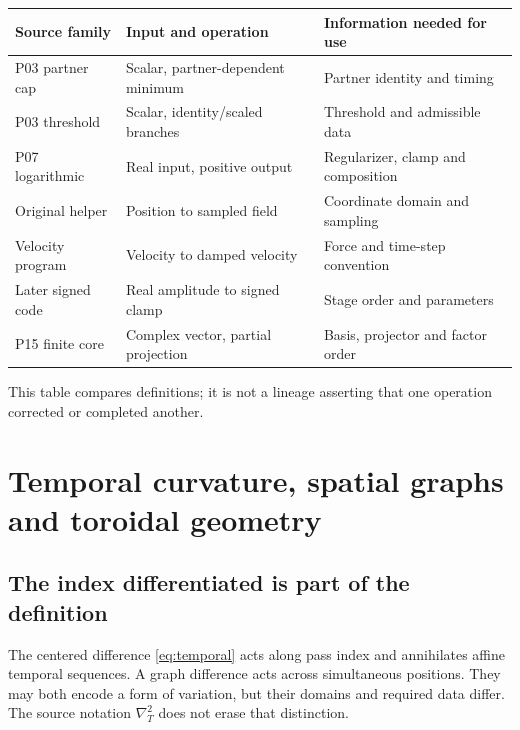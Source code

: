 \documentclass[11pt,a4paper]{article}
\theoremstyle{definition}
\numberwithin{equation}{section}
\begin{document}
\begin{center}
\small
\renewcommand{\arraystretch}{1.18}
\begin{tabularx}{\textwidth}{@{}p{}YY@{}}
\toprule
Source family & Input and operation & Information needed for use\\
\midrule
P03 partner cap & Scalar, partner-dependent minimum & Partner identity and timing\\
P03 threshold & Scalar, identity/scaled branches & Threshold and admissible data\\
P07 logarithmic & Real input, positive output & Regularizer, clamp and composition\\
Original helper & Position to sampled field & Coordinate domain and sampling\\
Velocity program & Velocity to damped velocity & Force and time-step convention\\
Later signed code & Real amplitude to signed clamp & Stage order and parameters\\
P15 finite core & Complex vector, partial projection & Basis, projector and factor order\\
\bottomrule
\end{tabularx}
\end{center}
This table compares definitions; it is not a lineage asserting that one
operation corrected or completed another.


\section{Temporal curvature, spatial graphs and toroidal geometry}
\label{sec:geometry}

\subsection{The index differentiated is part of the definition}

The centered difference \eqref{eq:temporal} acts along pass index and
annihilates affine temporal sequences. A graph difference acts across
simultaneous positions. They may both encode a form of variation, but their
domains and required data differ. The source notation $\nabla_T^2$ does
not erase that distinction.
\end{document}
